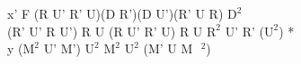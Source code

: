 x' F (R U' R' U)(D R')(D U')(R' U R) $\text{D}^2$\\
(R' U' R U') R U (R U' R' U) R U $\text{R}^2$ U' R' ($\text{U}^2$) *\\
y ($\text{M}^2$ U' M') $\text{U}^2$ $\text{M}^2$ $\text{U}^2$ (M' U M$\text{ }^2$)\\
